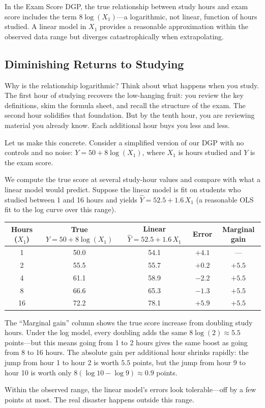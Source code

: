 \documentclass[11pt,a4paper]{article}
\theoremstyle{definition}
\theoremstyle{plain}
\theoremstyle{remark}
\begin{document}
In the Exam Score DGP, the true relationship between study hours and exam score includes the term $8\log(X_1)$---a logarithmic, not linear, function of hours studied. A linear model in $X_1$ provides a reasonable approximation within the observed data range but diverges catastrophically when extrapolating.

\subsection{Diminishing Returns to Studying}

Why is the relationship logarithmic? Think about what happens when you study. The first hour of studying recovers the low-hanging fruit: you review the key definitions, skim the formula sheet, and recall the structure of the exam. The second hour solidifies that foundation. But by the tenth hour, you are reviewing material you already know. Each additional hour buys you less and less.

Let us make this concrete. Consider a simplified version of our DGP with no controls and no noise: $Y = 50 + 8\log(X_1)$, where $X_1$ is hours studied and $Y$ is the exam score.

\begin{numermark}[title={The Diminishing Returns of Study Hours}]
We compute the true score at several study-hour values and compare with what a linear model would predict. Suppose the linear model is fit on students who studied between 1 and 16 hours and yields $\hat{Y} = 52.5 + 1.6\,X_1$ (a reasonable OLS fit to the log curve over this range).

\begin{center}
\begin{tabular}{@{}ccccc@{}}
\toprule
\textbf{Hours ($X_1$)} & \textbf{True $Y = 50 + 8\log(X_1)$} & \textbf{Linear $\hat{Y} = 52.5 + 1.6\,X_1$} & \textbf{Error} & \textbf{Marginal gain} \\
\midrule
1 & 50.0 & 54.1 & $+4.1$ & --- \\
2 & 55.5 & 55.7 & $+0.2$ & $+5.5$ \\
4 & 61.1 & 58.9 & $-2.2$ & $+5.5$ \\
8 & 66.6 & 65.3 & $-1.3$ & $+5.5$ \\
16 & 72.2 & 78.1 & $+5.9$ & $+5.5$ \\
\bottomrule
\end{tabular}
\end{center}

The ``Marginal gain'' column shows the true score increase from doubling study hours. Under the log model, every doubling adds the same $8\log(2) \approx 5.5$ points---but this means going from 1 to 2 hours gives the same boost as going from 8 to 16 hours. The absolute gain per additional hour shrinks rapidly: the jump from hour 1 to hour 2 is worth $5.5$ points, but the jump from hour 9 to hour 10 is worth only $8(\log 10 - \log 9) \approx 0.9$ points.

Within the observed range, the linear model's errors look tolerable---off by a few points at most. The real disaster happens outside this range.
\end{numermark}
\end{document}
